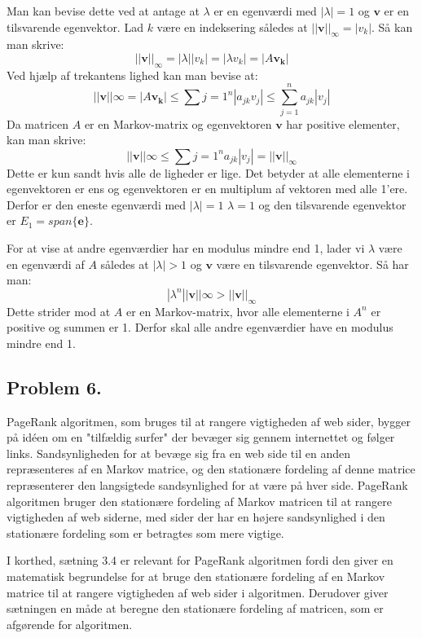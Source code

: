 Man kan bevise dette ved at antage at $\lambda$ er en egenværdi med $|\lambda| = 1$ og $\mathbf{v}$ er en tilsvarende egenvektor. Lad $k$ være en indeksering således at $||\mathbf{v}||_\infty = |v_k|$. Så kan man skrive:
$$||\mathbf{v}||_\infty = |\lambda ||v_k| = |\lambda v_k| = |A\mathbf{v_k}|$$
Ved hjælp af trekantens lighed kan man bevise at:
$$||\mathbf{v}||\infty = |A\mathbf{v_k}| \leq \sum{j=1}^n |a_{jk} v_j| \leq \sum_{j=1}^n a_{jk} |v_j|$$
Da matricen $A$ er en Markov-matrix og egenvektoren $\mathbf{v}$ har positive elementer, kan man skrive:
$$||\mathbf{v}||\infty \leq \sum{j=1}^n a_{jk} |v_j| = ||\mathbf{v}||_\infty$$
Dette er kun sandt hvis alle de ligheder er lige. Det betyder at alle elementerne i egenvektoren er ens og egenvektoren er en multiplum af vektoren med alle 1'ere. Derfor er den eneste egenværdi med $|\lambda| = 1$ $\lambda = 1$ og den tilsvarende egenvektor er $E_1 = span \{\mathbf{e}\}$.

For at vise at andre egenværdier har en modulus mindre end 1, lader vi $\lambda$ være en egenværdi af $A$ således at $|\lambda| > 1$ og $\mathbf{v}$ være en tilsvarende egenvektor. Så har man:
$$|\lambda^n||\mathbf{v}||\infty > ||\mathbf{v}||_\infty$$
Dette strider mod at $A$ er en Markov-matrix, hvor alle elementerne i $A^n$ er positive og summen er 1. Derfor skal alle andre egenværdier have en modulus mindre end 1.


\subsection*{Problem 6.}
PageRank algoritmen, som bruges til at rangere vigtigheden af web sider, bygger på idéen om en "tilfældig surfer" der bevæger sig gennem internettet og følger links. Sandsynligheden for at bevæge sig fra en web side til en anden repræsenteres af en Markov matrice, og den stationære fordeling af denne matrice repræsenterer den langsigtede sandsynlighed for at være på hver side. PageRank algoritmen bruger den stationære fordeling af Markov matricen til at rangere vigtigheden af web siderne, med sider der har en højere sandsynlighed i den stationære fordeling som er betragtes som mere vigtige.

I korthed, sætning 3.4 er relevant for PageRank algoritmen fordi den giver en matematisk begrundelse for at bruge den stationære fordeling af en Markov matrice til at rangere vigtigheden af web sider i algoritmen. Derudover giver sætningen en måde at beregne den stationære fordeling af matricen, som er afgørende for algoritmen.

